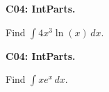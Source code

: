 \documentclass[12pt]{article}
\newcommand{\<}{\left\langle}
\renewcommand{\>}{\right\rangle}
\newcommand{\exerciseHeader}[4]{


  \vspace{0.5em}
  \textbf{#2}
  \vspace{0.5em}

}
\begin{document}
\begin{multicols}{2}
%

\exerciseHeader{2017 July 06}{C04: IntParts.}{
Use integration by parts.
}{Extra2}

Find \(\int 4x^3\ln(x)\,dx\).

\exerciseHeader{2017 July 06}{C04: IntParts.}{
Use integration by parts.
}{Extra2}

Find \(\int xe^x\,dx\).



%
%
%
%
%
%

\end{multicols}
\end{document}
